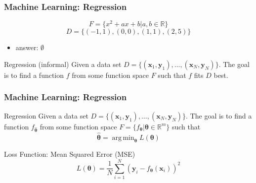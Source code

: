 \documentclass{beamer}
\DeclareMathOperator*{\argmin}{arg\,min}
\begin{document}
\begin{frame}
    \frametitle{Machine Learning: Regression}

    \begin{example}
        \[F = \{x^2 + ax + b \vert a, b \in \mathbb{R}\}\]
        \[D = \{(-1, 1), (0, 0), (1, 1), (2, 5)\}\]
        \begin{itemize}
            \item answer: $\emptyset$
        \end{itemize}
    \end{example}
    \pause
    \begin{block}{Regression (informal)}
        Given a data set $D = \{(\boldsymbol{x}_1, \boldsymbol{y}_1), \dots, (\boldsymbol{x}_N, \boldsymbol{y}_N)\}$. The goal is to find a function $f$ from some function space $F$ such that $f$ fits $D$ best.
    \end{block}

\end{frame}

\begin{frame}
    \frametitle{Machine Learning: Regression}

    \begin{block}{Regression}
        Given a data set $D = \{(\boldsymbol{x}_1, \boldsymbol{y}_1), \dots, (\boldsymbol{x}_N, \boldsymbol{y}_N)\}$. The goal is to find a function $f_{\hat{\boldsymbol{\theta}}}$ from some function space $F = \{f_{\boldsymbol{\theta}} \vert \boldsymbol{\theta} \in \mathbb{R}^m\}$ such that
        \[\hat{\boldsymbol{\theta}} = \argmin_{\boldsymbol{\theta}} L(\boldsymbol{\theta})\]
    \end{block}
    
    \begin{block}{Loss Function: Mean Squared Error (MSE)}
        \[L(\boldsymbol{\theta}) = \frac{1}{N}\sum_{i = 1}^{N} (\boldsymbol{y}_i - f_{\boldsymbol{\theta}}(\boldsymbol{x}_i))^2\]
    \end{block}

\end{frame}
\end{document}
